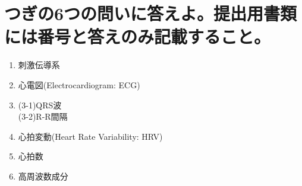 \documentclass[titlepage,a4paper]{jsarticle}
\begin{document}
\section{つぎの6つの問いに答えよ。提出用書類には番号と答えのみ記載すること。}%
\begin{enumerate}
      \item 刺激伝導系
      \item 心電図(Electrocardiogram: ECG)
      \item (3-1)QRS波\\
            (3-2)R-R間隔
      \item 心拍変動(Heart Rate Variability: HRV)
      \item 心拍数
      \item 高周波数成分
\end{enumerate}
\end{document}

